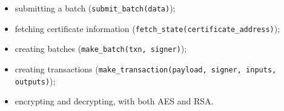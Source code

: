 \begin{itemize}
	\item submitting a batch (\texttt{submit\_batch(data)});
	\item fetching certificate information (\texttt{fetch\_state(certificate\_address)});
	\item creating batches (\texttt{make\_batch(txn, signer)});
	\item creating transactions (\texttt{make\_transaction(payload, signer, inputs, outputs)});
	\item encrypting and decrypting, with both AES and RSA.
\end{itemize}
